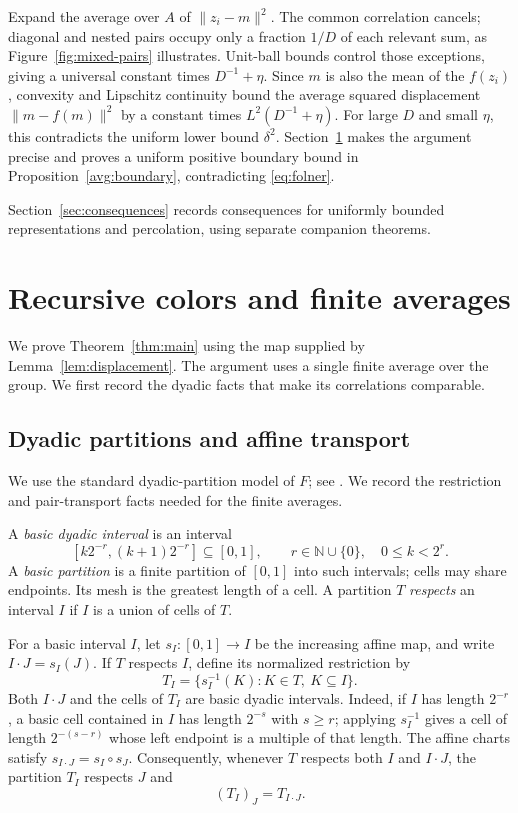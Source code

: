 \documentclass[11pt]{article}
\newcommand{\N}{\mathbb N}
\newcommand{\norm}[1]{\lVert #1\rVert}
\theoremstyle{definition}
\numberwithin{equation}{section}
\begin{document}
Expand the average over \(A\) of \(\norm{z_i-m}^2\). The common
correlation cancels; diagonal and nested pairs occupy only a fraction
\(1/D\) of each relevant sum, as Figure~\ref{fig:mixed-pairs} illustrates.
Unit-ball bounds control those exceptions, giving a universal constant
times \(D^{-1}+\eta\). Since \(m\) is also the mean of the \(f(z_i)\),
convexity and Lipschitz continuity bound the average squared displacement
\(\norm{m-f(m)}^2\) by a constant times \(L^2(D^{-1}+\eta)\).
For large \(D\) and small \(\eta\), this contradicts the uniform lower
bound \(\delta^2\). Section~\ref{sec:proof} makes the argument precise and proves a
uniform positive boundary bound in Proposition~\ref{avg:boundary},
contradicting \eqref{eq:folner}.

Section~\ref{sec:consequences} records consequences for uniformly bounded
representations and percolation, using separate companion theorems.

\section{Recursive colors and finite averages}\label{sec:proof}

We prove Theorem~\ref{thm:main} using the map supplied by
Lemma~\ref{lem:displacement}.  The argument uses a single finite average
over the group.  We first record the dyadic facts that make its
correlations comparable.

\subsection{Dyadic partitions and affine transport}\label{sec:dyadic}

We use the standard dyadic-partition model of $F$; see
\cite[Section~2, Lemma~2.2]{CannonFloydParry1996}. We record the
restriction and pair-transport facts needed for the finite averages.

A \emph{basic dyadic interval} is an interval
\[
  [k2^{-r},(k+1)2^{-r}]\subseteq[0,1],
  \qquad r\in\N\cup\{0\},\quad 0\leq k<2^r.
\]
A \emph{basic partition} is a finite partition of $[0,1]$ into such
intervals; cells may share endpoints.  Its mesh is the greatest length
of a cell.  A partition $T$ \emph{respects} an interval $I$ if $I$ is a
union of cells of $T$.

For a basic interval $I$, let $s_I:[0,1]\to I$ be the increasing affine
map, and write $I\cdot J=s_I(J)$.  If $T$ respects $I$, define its
normalized restriction by
\[
  T_I=\{s_I^{-1}(K):K\in T,\ K\subseteq I\}.
\]
Both $I\cdot J$ and the cells of $T_I$ are basic dyadic intervals.
Indeed, if $I$ has length $2^{-r}$, a basic cell contained in $I$ has
length $2^{-s}$ with $s\geq r$; applying $s_I^{-1}$ gives a cell of
length $2^{-(s-r)}$ whose left endpoint is a multiple of that length.
The affine charts satisfy $s_{I\cdot J}=s_I\circ s_J$.  Consequently,
whenever $T$ respects both $I$ and $I\cdot J$, the partition $T_I$
respects $J$ and
\begin{equation}\label{dyad:restriction}
  (T_I)_J=T_{I\cdot J}.
\end{equation}
\end{document}
